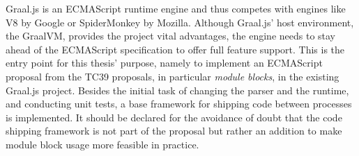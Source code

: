 Graal.js is an ECMAScript runtime engine and thus competes with engines like V8 by Google or SpiderMonkey by Mozilla. Although Graal.js' host environment, the GraalVM, provides the project vital advantages, the engine needs to stay ahead of the ECMAScript specification to offer full feature support. This is the entry point for this thesis' purpose, namely to implement an ECMAScript proposal from the TC39 proposals, in particular \emph{module blocks}, in the existing Graal.js project. Besides the initial task of changing the parser and the runtime, and conducting unit tests, a base framework for shipping code between processes is implemented.  It should be declared for the avoidance of doubt that the code shipping framework is not part of the proposal but rather an addition to make module block usage more feasible in practice.

